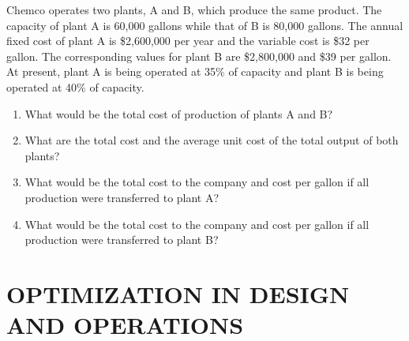 \begin{exercises}
    \begin{exercise}
    \label{sea-8-30}
        Chemco operates two plants, A and B, which produce the same product. The capacity of plant A is 60,000 gallons while that of B is 80,000 gallons. The annual fixed cost of plant A is \$2,600,000 per year and the variable cost is \$32 per gallon. The corresponding values for plant B are \$2,800,000 and \$39 per gallon. At present, plant A is being operated at 35\% of capacity and plant B is being operated at 40\% of capacity.
        \begin{enumerate}[label=\alph*)]
            \item What would be the total cost of production of plants A and B?
            \item What are the total cost and the average unit cost of the total output of both plants?
            \item What would be the total cost to the company and cost per gallon if all production were transferred to plant A?
            \item What would be the total cost to the company and cost per gallon if all production were transferred to plant B?
        \end{enumerate}
    \end{exercise}
    \begin{solution}
    \end{solution}

\end{exercises}


\chapter{OPTIMIZATION IN DESIGN AND OPERATIONS}

